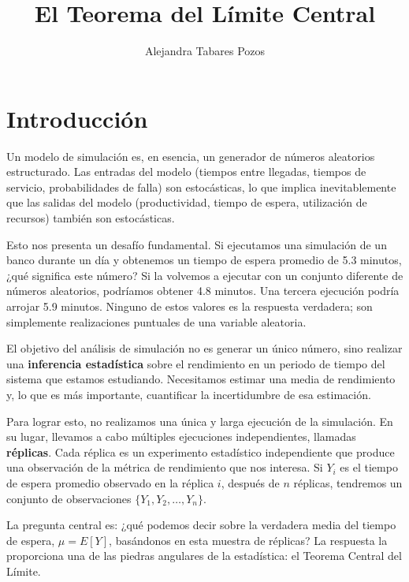 \documentclass[11pt, letterpaper]{article}
\title{El Teorema del Límite Central}
\author{Alejandra Tabares Pozos}
\date{}
\begin{document}
\maketitle
\tableofcontents
\newpage

\section{Introducción}

Un modelo de simulación es, en esencia, un generador de números aleatorios estructurado. Las entradas del modelo (tiempos entre llegadas, tiempos de servicio, probabilidades de falla) son estocásticas, lo que implica inevitablemente que las salidas del modelo (productividad, tiempo de espera, utilización de recursos) también son estocásticas.

Esto nos presenta un desafío fundamental. Si ejecutamos una simulación de un banco durante un día y obtenemos un tiempo de espera promedio de 5.3 minutos, ¿qué significa este número? Si la volvemos a ejecutar con un conjunto diferente de números aleatorios, podríamos obtener 4.8 minutos. Una tercera ejecución podría arrojar 5.9 minutos. Ninguno de estos valores es la respuesta verdadera; son simplemente realizaciones puntuales de una variable aleatoria.

El objetivo del análisis de simulación no es generar un único número, sino realizar una \textbf{inferencia estadística} sobre el rendimiento en un periodo de tiempo del sistema que estamos estudiando. Necesitamos estimar una media de rendimiento y, lo que es más importante, cuantificar la incertidumbre de esa estimación.

Para lograr esto, no realizamos una única y larga ejecución de la simulación. En su lugar, llevamos a cabo múltiples ejecuciones independientes, llamadas \textbf{réplicas}. Cada réplica es un experimento estadístico independiente que produce una observación de la métrica de rendimiento que nos interesa. Si $Y_i$ es el tiempo de espera promedio observado en la réplica $i$, después de $n$ réplicas, tendremos un conjunto de observaciones $\{Y_1, Y_2, \dots, Y_n\}$.

La pregunta central es: ¿qué podemos decir sobre la verdadera media del tiempo de espera, $\mu = E[Y]$, basándonos en esta muestra de réplicas? La respuesta la proporciona una de las piedras angulares de la estadística: el Teorema Central del Límite.
\end{document}
